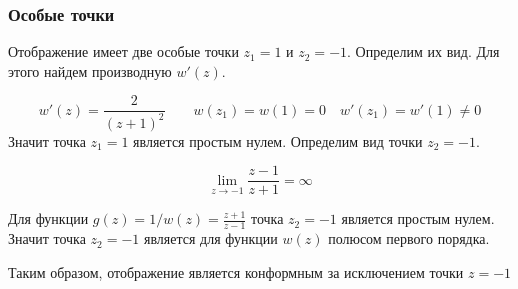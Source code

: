 \begin{frame}\frametitle{Особые точки}
	Отображение имеет две особые точки \(z_1 = 1\) и \(z_2 = -1\).
	Определим их вид.
	Для этого найдем производную \(w'(z)\).

	\[
		w'(z) = \frac{2}{(z+1)^2}
		\qquad
		w(z_1) = w(1) = 0
		\quad
		w'(z_1) = w'(1) \neq 0
	\]
	Значит точка \(z_1 = 1\) является простым нулем.
	Определим вид точки \(z_2 = -1\).

	\[ \lim_{z \to -1} \frac{z-1}{z+1} = \infty \]

	Для функции \(g(z) = 1/w(z) = \frac{z+1}{z-1}\)
	точка \(z_2 = -1\) является простым нулем.
	Значит точка \(z_2 = -1\) является для функции \(w(z)\) полюсом первого порядка.

  Таким образом, отображение является конформным за исключением точки \(z = -1\)
\end{frame}
